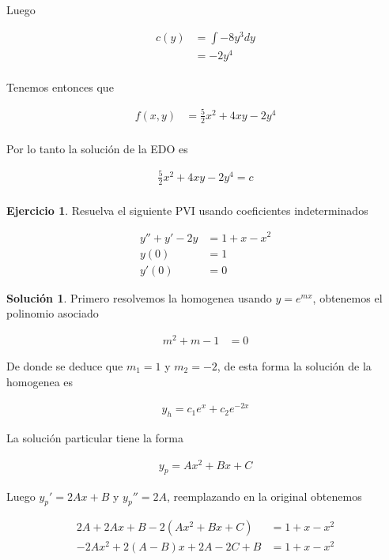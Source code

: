 \documentclass{article}
\theoremstyle{plain}
\theoremstyle{definition}
\newtheorem{ejer}[thm]{Ejercicio}
\newtheorem{sol}[thm]{Solución}
\begin{document}
Luego

\begin{align*}
    c(y ) &= \int -8y^3 dy \\
    &= -2y^4\\
\end{align*}

Tenemos entonces que

\begin{align*}
    f(x,y) &= \frac{5}{2}x^2+4xy-2y^4 \\
\end{align*}

Por lo tanto la solución de la EDO es

\begin{align*}
    \frac{5}{2}x^2+4xy-2y^4 =c \\
\end{align*}


\newpage


\begin{ejer}Resuelva el siguiente PVI usando coeficientes indeterminados
\end{ejer}


\begin{align*}
    y''+y'-2y &= 1+x-x^2 \\
    y(0) &= 1 \\
    y'(0) &= 0
\end{align*}

\begin{sol}Primero resolvemos la homogenea usando $y=e^{mx}$, obtenemos el polinomio asociado
\end{sol}



\begin{align*}
    m^2+m-1 &= 0
\end{align*}

De donde se deduce que $m_1=1$ y $m_2=-2$, de esta forma la solución de la homogenea es

\begin{align*}
    y_h= c_1e^x+c_2e^{-2x}
\end{align*}

La solución particular tiene la forma


\begin{align*}
    y_p= Ax^2+Bx+C
\end{align*}

Luego $y_p'=2Ax+B$ y $y_p''=2A$, reemplazando en la original obtenemos


\begin{align*}
    2A+2Ax+B-2(Ax^2+Bx+C) &= 1+x-x^2 \\
    -2Ax^2+2(A-B)x+2A-2C+B &= 1+x-x^2 \\
\end{align*}
\end{document}
